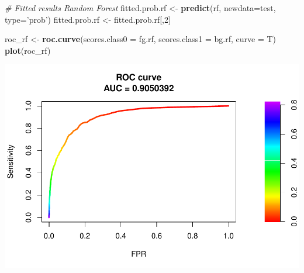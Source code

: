 \documentclass[]{article}
\newenvironment{Shaded}{\begin{snugshade}}{\end{snugshade}}
\newcommand{\CommentTok}[1]{\textcolor[rgb]{0.56,0.35,0.01}{\textit{#1}}}
\newcommand{\DataTypeTok}[1]{\textcolor[rgb]{0.13,0.29,0.53}{#1}}
\newcommand{\DecValTok}[1]{\textcolor[rgb]{0.00,0.00,0.81}{#1}}
\newcommand{\KeywordTok}[1]{\textcolor[rgb]{0.13,0.29,0.53}{\textbf{#1}}}
\newcommand{\NormalTok}[1]{#1}
\newcommand{\OperatorTok}[1]{\textcolor[rgb]{0.81,0.36,0.00}{\textbf{#1}}}
\newcommand{\StringTok}[1]{\textcolor[rgb]{0.31,0.60,0.02}{#1}}
\begin{document}
\begin{Shaded}
\begin{Highlighting}[]
\CommentTok{# Fitted results Random Forest}
\NormalTok{fitted.prob.rf <-}\StringTok{ }\KeywordTok{predict}\NormalTok{(rf, }\DataTypeTok{newdata=}\NormalTok{test, }\DataTypeTok{type=}\StringTok{'prob'}\NormalTok{) }
\NormalTok{fitted.prob.rf <-}\StringTok{ }\NormalTok{fitted.prob.rf[,}\DecValTok{2}\NormalTok{]}
\end{Highlighting}
\end{Shaded}

\begin{Shaded}
\end{Shaded}

\begin{Shaded}
\begin{Highlighting}[]
\NormalTok{roc_rf <-}\StringTok{ }\KeywordTok{roc.curve}\NormalTok{(}\DataTypeTok{scores.class0 =}\NormalTok{ fg.rf,}
                    \DataTypeTok{scores.class1 =}\NormalTok{ bg.rf,}
                    \DataTypeTok{curve =}\NormalTok{ T)}
\KeywordTok{plot}\NormalTok{(roc_rf)}
\end{Highlighting}
\end{Shaded}

\includegraphics{lagged_analyses_files/figure-latex/unnamed-chunk-38-1.pdf}
\end{document}
